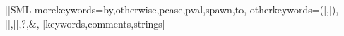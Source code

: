 []{SML}{%
  morekeywords={by,otherwise,pcase,pval,spawn,to},
  otherkeywords={(|,|),[|,|],?,\&},
}[keywords,comments,strings]%
